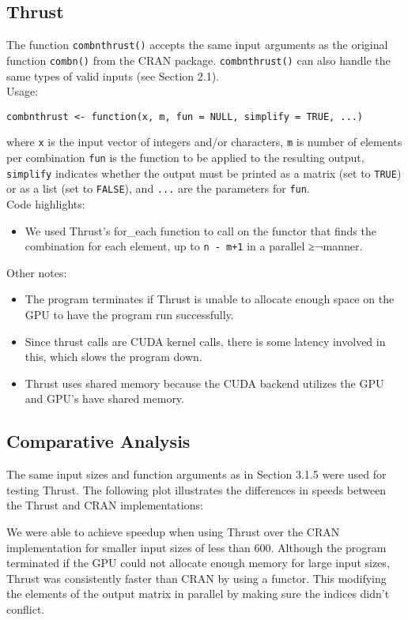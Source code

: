 \subsection{Thrust}

The function \texttt{combnthrust()} accepts the same input arguments as the original function \texttt{combn()} from the CRAN package. \texttt{combnthrust()} can also handle the same types of valid inputs (see Section 2.1).\\
\null
Usage:\\
\null

\texttt{combnthrust <- function(x, m, fun = NULL, simplify = TRUE, ...)}\\
\null

where \texttt{x} is the input vector of integers and/or characters, \texttt{m} is number of elements per combination
\texttt{fun} is the function to be applied to the resulting output, \texttt{simplify} indicates whether the output must be printed as a matrix (set to \texttt{TRUE}) or as a list (set to \texttt{FALSE}), and \texttt{...} are the parameters for \texttt{fun}.\\

\null
Code highlights:\\
\begin{itemize}
\item We used Thrust's  for\_each function to call on the functor that finds the combination for each element, up to \texttt{n - m+1} in a parallel ≥¬manner. 
\end{itemize}
Other notes:
\begin{itemize}
\item The program terminates if Thrust is unable to allocate enough space on the GPU to have the program run successfully. 
\item Since thrust calls are CUDA kernel calls, there is some latency involved in this, which slows the program down. 
\item Thrust uses shared memory because the CUDA backend utilizes the GPU and GPU's have shared memory. 
\end{itemize}




\subsection{Comparative Analysis}
The same input sizes and function arguments as in Section 3.1.5 were used for testing Thrust. The following plot illustrates the differences in speeds between the Thrust and CRAN implementations:\\
\null

We were able to achieve speedup when using Thrust over the CRAN implementation for smaller input sizes of less than 600. Although the program terminated if the GPU could not allocate enough memory for large input sizes, Thrust was consistently faster than CRAN by using a functor. This modifying the elements of the output matrix in parallel by making sure the indices didn't conflict. 
